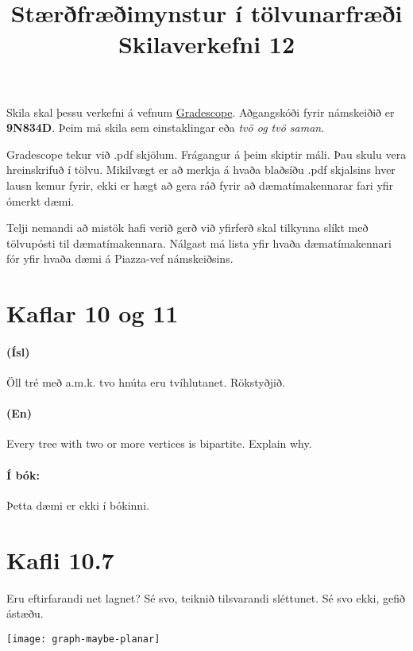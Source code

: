 \documentclass{article}
\title{Stærðfræðimynstur í tölvunarfræði \\ Skilaverkefni 12}
\author{}
\begin{document}
\maketitle

Skila skal þessu verkefni á vefnum \href{https://gradescope.com/courses/9487}{Gradescope}. Aðgangskóði fyrir námskeiðið er \textbf{9N834D}.
Þeim má skila sem einstaklingar eða \emph{tvö og tvö saman}.

Gradescope tekur við .pdf skjölum. Frágangur á þeim skiptir máli. Þau skulu vera hreinskrifuð í tölvu. 
Mikilvægt er að merkja á hvaða blaðsíðu .pdf skjalsins hver lausn kemur fyrir, ekki er hægt að gera ráð fyrir að dæmatímakennarar fari yfir ómerkt dæmi.

Telji nemandi að mistök hafi verið gerð við yfirferð skal tilkynna slíkt með tölvupósti til dæmatímakennara. Nálgast má lista yfir hvaða dæmatímakennari fór yfir hvaða dæmi á Piazza-vef námskeiðsins.

\section{Kaflar 10 og 11}

\question 


\paragraph{(Ísl)} Öll tré með a.m.k. tvo hnúta eru tvíhlutanet. Rökstyðjið.

\paragraph{(En)} Every tree with two or more vertices is bipartite. Explain why.

\paragraph{Í bók:} Þetta dæmi er ekki í bókinni.


\section{Kafli 10.7}

\question Eru eftirfarandi net lagnet? Sé svo, teiknið tilsvarandi sléttunet. Sé svo ekki, gefið ástæðu.

\begin{center}
    \texttt{[image: graph-maybe-planar]}
\end{center}
\end{document}
